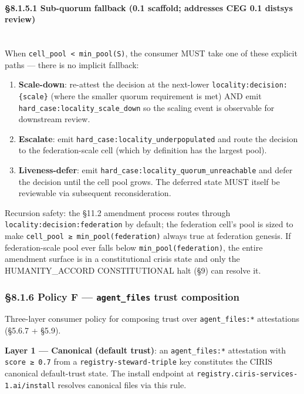 \documentclass[10pt]{article}
\begin{document}
\paragraph{§8.1.5.1 Sub-quorum fallback (0.1 scaffold; addresses CEG 0.1 distsys review)}\mbox{}\\


When \texttt{cell\_pool < min\_pool(S)}, the consumer MUST take one of these explicit paths — there is no implicit fallback:


\begin{enumerate}\setlength\itemsep{0pt}
\item \textbf{Scale-down}: re-attest the decision at the next-lower \texttt{locality:decision:\{scale\}} (where the smaller quorum requirement is met) AND emit \texttt{hard\_case:locality\_scale\_down} so the scaling event is observable for downstream review.
\item \textbf{Escalate}: emit \texttt{hard\_case:locality\_underpopulated} and route the decision to the federation-scale cell (which by definition has the largest pool).
\item \textbf{Liveness-defer}: emit \texttt{hard\_case:locality\_quorum\_unreachable} and defer the decision until the cell pool grows. The deferred state MUST itself be reviewable via subsequent reconsideration.
\end{enumerate}


Recursion safety: the §11.2 amendment process routes through \texttt{locality:decision:federation} by default; the federation cell's pool is sized to make \texttt{cell\_pool ≥ min\_pool(federation)} always true at federation genesis. If federation-scale pool ever falls below \texttt{min\_pool(federation)}, the entire amendment surface is in a constitutional crisis state and only the HUMANITY\_ACCORD CONSTITUTIONAL halt (§9) can resolve it.


\subsubsection*{§8.1.6 Policy F — \texttt{agent\_files} trust composition}


Three-layer consumer policy for composing trust over \texttt{agent\_files:*} attestations (§5.6.7 + §5.9).


\textbf{Layer 1 — Canonical (default trust)}: an \texttt{agent\_files:*} attestation with \texttt{score ≥ 0.7} from a \texttt{registry-steward-triple} key constitutes the CIRIS canonical default-trust state. The install endpoint at \texttt{registry.ciris-services-1.ai/install} resolves canonical files via this rule.
\end{document}
